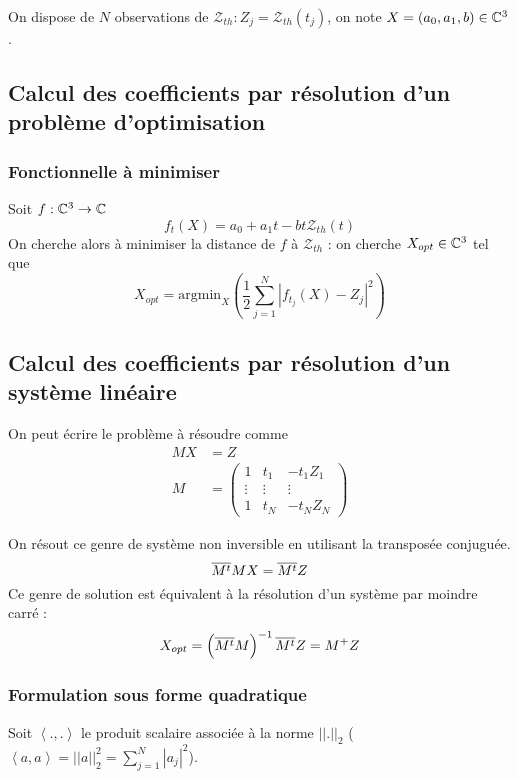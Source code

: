 On dispose de $N$ observations de $\mathcal Z_{th} : Z_j = \mathcal Z_{th}(t_j)$, on note $X = (a_0,a_1,b) \in \mathbb C^3$.
\subsection{Calcul des coefficients par résolution d'un problème d'optimisation}
\subsubsection{Fonctionnelle à minimiser}
Soit $f:\mathbb C^3 \rightarrow \mathbb C$
\[
f_t(X) = a_0 + a_1 t - b t \mathcal Z_{th}(t)
\]
On cherche alors à minimiser la distance de $f$ à $\mathcal Z_{th}$  : on cherche $X_{opt}\in \mathbb C^3$ tel que
\[
X_{opt} = \text{argmin}_X \left( \frac{1}{2}\sum_{j=1}^{N} | f_{t_j}(X) - Z_j|^2 \right)
\]

\subsection{Calcul des coefficients par résolution d'un système linéaire}
On peut écrire le problème à résoudre comme
\begin{align*}
	MX &= Z\\
	M &=
	\begin{pmatrix}
		1 & t_1 & -t_1Z_1 \\
		\vdots & \vdots & \vdots \\
		1 & t_N & -t_NZ_N
	\end{pmatrix}
\end{align*}

On résout ce genre de système non inversible en utilisant la transposée conjuguée. 
\begin{equation}
   {\overline{M^t}}MX = {\overline{M^t}} Z
\end{equation}
Ce genre de solution est équivalent à la résolution d'un système par moindre carré \cite{penrose_best_1956} :
\begin{equation}
  X_{opt} = \left({\overline{M^t}}M\right)^{-1}{\overline{M^t}} Z = M^+ Z
\end{equation}

\subsubsection{Formulation sous forme quadratique}\label{sec:formQ}

Soit $\left<.,.\right>$ le produit scalaire associée à la norme $||.||_2$ ($\left<a,a\right> = ||a||_2^2 = \sum_{j=1}^N|a_j|^2$).

